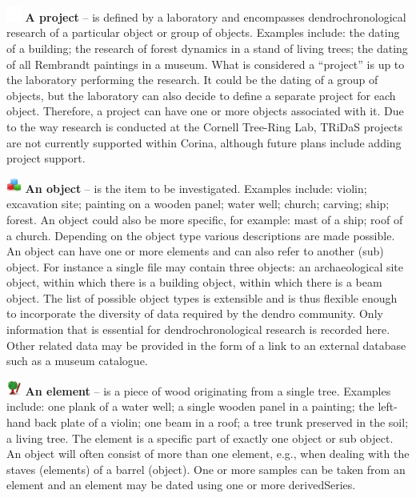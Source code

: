 \begin{description}

\item \includegraphics[width=5mm]{Images/pixel.png}  \textbf{A project} -- is defined by a laboratory and encompasses dendrochronological research of a particular object or group of objects.  Examples include: the dating of a building; the research of forest dynamics in a stand of living trees; the dating of all Rembrandt paintings in a museum. What is considered a ``project'' is up to the laboratory performing the research. It could be the dating of a group of objects, but the laboratory can also decide to define a separate project for each object. Therefore, a project can have one or more objects associated with it.  Due to the way research is conducted at the Cornell Tree-Ring Lab, TRiDaS projects are not currently supported within Corina, although future plans include adding project support.

\item \includegraphics[width=5mm]{../src/edu/cornell/dendro/corina_resources/Icons/128x128/object.png} \textbf{An object} -- is the item to be investigated.  Examples include: violin; excavation site; painting on a wooden panel; water well; church; carving; ship; forest. An object could also be more specific, for example: mast of a ship; roof of a church. Depending on the object type various descriptions are made possible. An object can have one or more elements and can also refer to another (sub) object.  For instance a single file may contain three objects: an archaeological site object, within which there is a building object, within which there is a beam object.  The list of possible object types is extensible and is thus flexible enough to incorporate the diversity of data required by the dendro community.  Only information that is essential for dendrochronological research is recorded here. Other related data may be provided in the form of a link to an external database such as a museum catalogue. 

\item \includegraphics[width=5mm]{../src/edu/cornell/dendro/corina_resources/Icons/48x48/element.png} \textbf{An element} -- is a piece of wood originating from a single tree. Examples include: one plank of a water well; a single wooden panel in a painting; the left-hand back plate of a violin; one beam in a roof; a tree trunk preserved in the soil; a living tree. The element is a specific part of exactly one object or sub object.  An object will often consist of more than one element, e.g., when dealing with the staves (elements) of a barrel (object).  One or more samples can be taken from an element and an element may be dated using one or more derivedSeries.


\end{description}
